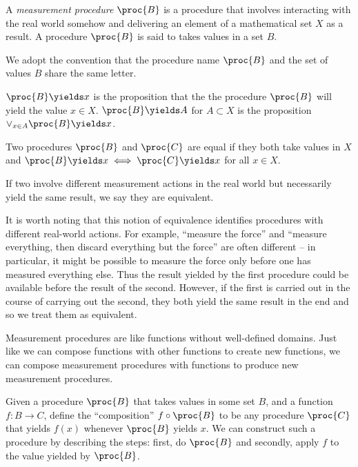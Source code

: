 \begin{definition}
A \emph{measurement procedure} $\proc{B}$ is a procedure that involves interacting with the real world somehow and delivering an element of a mathematical set $X$ as a result. A procedure $\proc{B}$ is said to takes values in a set $B$.
\end{definition}

We adopt the convention that the procedure name $\proc{B}$ and the set of values $B$ share the same letter.

\begin{definition}
$\proc{B}\yields x$ is the proposition that the the procedure $\proc{B}$ will yield the value $x\in X$. $\proc{B}\yields A$ for $A\subset X$ is the proposition $\lor_{x\in A} \proc{B}\yields x$.
\end{definition}

\begin{definition}\label{def:equality}
Two procedures $\proc{B}$ and $\proc{C}$ are equal if they both take values in $X$ and $\proc{B}\yields x\iff \proc{C}\yields x$ for all $x\in X$.
\end{definition}

If two involve different measurement actions in the real world but necessarily yield the same result, we say they are equivalent.

It is worth noting that this notion of equivalence identifies procedures with different real-world actions. For example, ``measure the force'' and ``measure everything, then discard everything but the force'' are often different -- in particular, it might be possible to measure the force only before one has measured everything else. Thus the result yielded by the first procedure could be available before the result of the second. However, if the first is carried out in the course of carrying out the second, they both yield the same result in the end and so we treat them as equivalent. 

Measurement procedures are like functions without well-defined domains. Just like we can compose functions with other functions to create new functions, we can compose measurement procedures with functions to produce new measurement procedures.

\begin{definition}
Given a procedure $\proc{B}$ that takes values in some set $B$, and a function $f:B\to C$, define the ``composition'' $f\circ \proc{B}$ to be any procedure $\proc{C}$ that yields $f(x)$ whenever $\proc{B}$ yields $x$. We can construct such a procedure by describing the steps: first, do $\proc{B}$ and secondly, apply $f$ to the value yielded by $\proc{B}$.
\end{definition}


